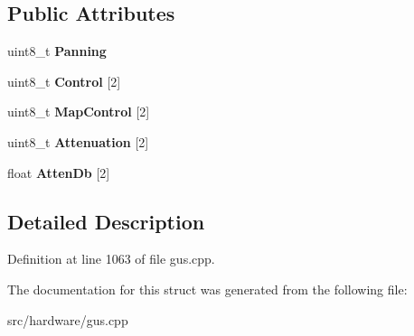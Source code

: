 \subsection*{Public Attributes}
\begin{DoxyCompactItemize}
\item 
\hypertarget{structgus__ICS2101_1_1mixcontrol_a51061e6484c9e123414be0af811b714f}{uint8\-\_\-t {\bfseries Panning}}\label{structgus__ICS2101_1_1mixcontrol_a51061e6484c9e123414be0af811b714f}

\item 
\hypertarget{structgus__ICS2101_1_1mixcontrol_abc998b7038d01a551dbc659027d54f66}{uint8\-\_\-t {\bfseries Control} \mbox{[}2\mbox{]}}\label{structgus__ICS2101_1_1mixcontrol_abc998b7038d01a551dbc659027d54f66}

\item 
\hypertarget{structgus__ICS2101_1_1mixcontrol_a916268f834849e724a87c1f6510bb964}{uint8\-\_\-t {\bfseries Map\-Control} \mbox{[}2\mbox{]}}\label{structgus__ICS2101_1_1mixcontrol_a916268f834849e724a87c1f6510bb964}

\item 
\hypertarget{structgus__ICS2101_1_1mixcontrol_afb5439928a40cd9679b7128298f92702}{uint8\-\_\-t {\bfseries Attenuation} \mbox{[}2\mbox{]}}\label{structgus__ICS2101_1_1mixcontrol_afb5439928a40cd9679b7128298f92702}

\item 
\hypertarget{structgus__ICS2101_1_1mixcontrol_afc8504acb2e1fb3afcc045e255023605}{float {\bfseries Atten\-Db} \mbox{[}2\mbox{]}}\label{structgus__ICS2101_1_1mixcontrol_afc8504acb2e1fb3afcc045e255023605}

\end{DoxyCompactItemize}


\subsection{Detailed Description}


Definition at line 1063 of file gus.\-cpp.



The documentation for this struct was generated from the following file\-:\begin{DoxyCompactItemize}
\item 
src/hardware/gus.\-cpp\end{DoxyCompactItemize}
